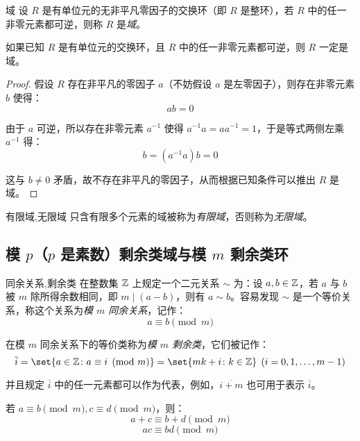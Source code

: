 \begin{definition}{域}
	设 $R$ 是有单位元的无非平凡零因子的交换环（即 $R$ 是整环），若 $R$ 中的任一非零元素都可逆，则称 $R$ 是\emph{域}。
\end{definition}

\begin{proposition}
	如果已知 $R$ 是有单位元的交换环，且 $R$ 中的任一非零元素都可逆，则 $R$ 一定是域。
\end{proposition}

\begin{proof}
	假设 $R$ 存在非平凡的零因子 $a$（不妨假设 $a$ 是左零因子），则存在非零元素 $b$ 使得：
	$$
	a b = 0
	$$

	由于 $a$ 可逆，所以存在非零元素 $a^{-1}$ 使得 $a^{-1} a = a a^{-1} = 1$，于是等式两侧左乘 $a^{-1}$ 得：
	$$
	b = (a^{-1} a) b = 0
	$$

	这与 $b \ne 0$ 矛盾，故不存在非平凡的零因子，从而根据已知条件可以推出 $R$ 是域。
\end{proof}

\begin{definition}{有限域,无限域}
	只含有限多个元素的域被称为\emph{有限域}，否则称为\emph{无限域}。
\end{definition}

\subsection{模 $p$（$p$ 是素数）剩余类域与模 $m$ 剩余类环}

\begin{definition}{同余关系,剩余类}
	在整数集 $\mathbb Z$ 上规定一个二元关系 $\sim$ 为：设 $a, b \in \mathbb Z$，若 $a$ 与 $b$ 被 $m$ 除所得余数相同，即 $m \mid (a - b)$，则有 $a \sim b$。容易发现 $\sim$ 是一个等价关系，称这个关系为\emph{模 $m$ 同余关系}，记作：
	$$
	a \equiv b \pmod{m}
	$$

	在模 $m$ 同余关系下的等价类称为\emph{模 $m$ 剩余类}，它们被记作：
	$$
	\overline i = \set{a \in \Z \colon a \equiv i \pmod{m}} = \set{mk + i \colon k \in \Z} \pod{i = 0, 1, \ldots, m - 1}
	$$

	并且规定 $\overline i$ 中的任一元素都可以作为代表，例如，$\overline{i + m}$ 也可用于表示 $\overline i$。
\end{definition}

\begin{proposition}
	若 $a \equiv b \pmod{m}, c \equiv d \pmod{m}$，则：
	$$
	a + c \equiv b + d \pmod{m}
	$$$$
	ac \equiv bd \pmod{m}
	$$
\end{proposition}


